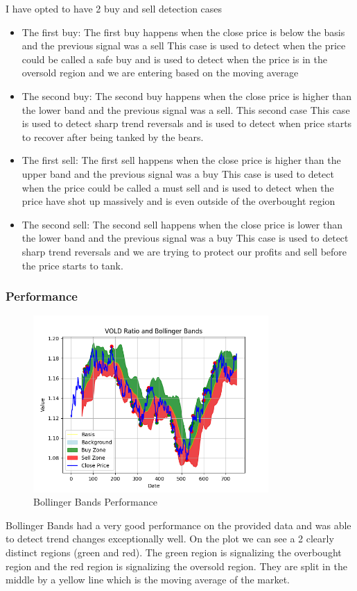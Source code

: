 \documentclass{imc-inf}
\begin{document}
				I have opted to have 2 buy and sell detection cases
				\begin{itemize}
					\item The first buy: The first buy happens when the close price is below the basis and the previous signal was a sell
						\subitem This case is used to detect when the price could be called a safe buy and is used to detect when the price is in the oversold 
						region and we are entering based on the moving average
					\item The second buy: The second buy happens when the close price is higher than the lower band and the previous signal was a sell. This second case
						\subitem This case is used to detect sharp trend reversals and is used to detect when price starts to recover after being tanked by the bears. 
					\item The first sell: The first sell happens when the close price is higher than the upper band and the previous signal was a buy 
						\subitem This case is used to detect when the price could be called a must sell and is used to detect when the price have shot up massively and 
						is even outside of the overbought region
					\item The second sell: The second sell happens when the close price is lower than the lower band and the previous signal was a buy
						\subitem This case is used to detect sharp trend reversals and we are trying to protect our profits and sell before the price starts to tank.
				\end{itemize}

			\subsubsection{Performance}
				\begin{figure}[h!]
					\centering
					\includegraphics[width=0.8\textwidth]{bollinger_bands_plot.png}
					\caption{Bollinger Bands Performance}
					\label{fig:bollinger_bands_performance}
				\end{figure}
				Bollinger Bands had a very good performance on the provided data and was able to detect trend changes exceptionally well. 
				On the plot we can see a 2 clearly distinct regions (green and red). The green region is signalizing the overbought region and the red
				region is signalizing the oversold region.
				They are split in the middle by a yellow line which is the moving average of the market. 
				
\end{document}
